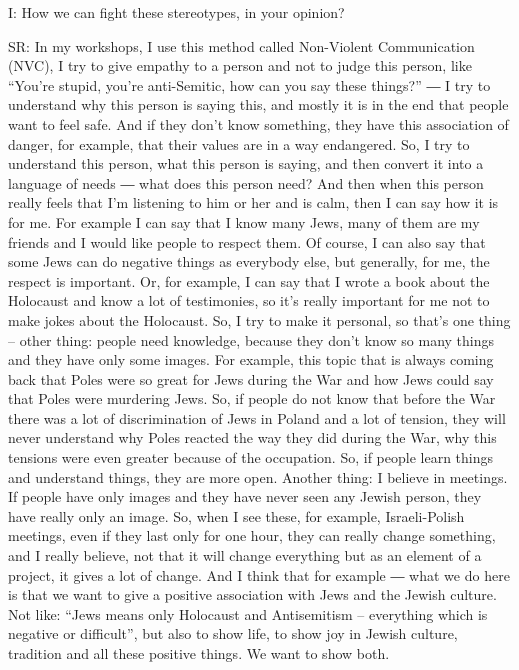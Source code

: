  

I: How we can fight these stereotypes, in your opinion? 

 

SR: In my workshops, I use this method called Non-Violent Communication (NVC), I try to give empathy to a person and not to judge this person, like “You’re stupid, you’re anti-Semitic, how can you say these things?” ― I try to understand why this person is saying this, and mostly it is in the end that people want to feel safe. And if they don’t know something, they have this association of danger, for example, that their values are in a way endangered. So, I try to understand this person, what this person is saying, and then convert it into a language of needs ― what does this person need? And then when this person really feels that I’m listening to him or her and is calm, then I can say how it is for me. For example I can say that I know many Jews, many of them are my friends and I would like people to respect them. Of course, I can also say that some Jews can do negative things as everybody else, but generally, for me, the respect is important. Or, for example, I can say that I wrote a book about the Holocaust and know a lot of testimonies, so it’s really important for me not to make jokes about the Holocaust. So, I try to make it personal, so that’s one thing – other thing: people need knowledge, because they don’t know so many things and they have only some images. For example, this topic that is always coming back that Poles were so great for Jews during the War and how Jews could say that Poles were murdering Jews. So, if people do not know that before the War there was a lot of discrimination of Jews in Poland and a lot of tension, they will never understand why Poles reacted the way they did during the War, why this tensions were even greater because of the occupation. So, if people learn things and understand things, they are more open.  
Another thing: I believe in meetings. If people have only images and they have never seen any Jewish person, they have really only an image. So, when I see these, for example, Israeli-Polish meetings, even if they last only for one hour, they can really change something, and I really believe, not that it will change everything but as an element of a project, it gives a lot of change. And I think that for example ― what we do here is that we want to give a positive association with Jews and the Jewish culture. Not like: “Jews means only Holocaust and Antisemitism – everything which is negative or difficult”, but also to show life, to show joy in Jewish culture, tradition and all these positive things. We want to show both. 

